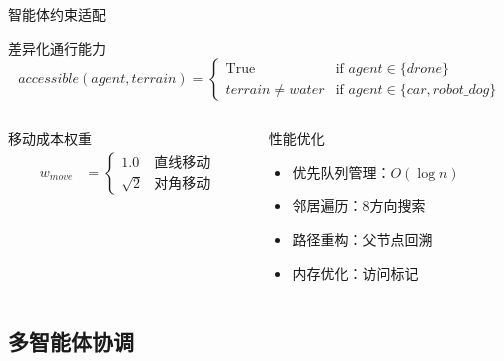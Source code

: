 \documentclass[
10pt,
aspectratio=169,
]{beamer}
\begin{document}
\begin{frame}{智能体约束适配}
    \begin{block}{差异化通行能力}
        \begin{equation}
            accessible(agent, terrain) = \begin{cases}
            \text{True} & \text{if } agent \in \{drone\} \\
            terrain \neq water & \text{if } agent \in \{car, robot\_dog\}
            \end{cases}
        \end{equation}
    \end{block}
    
    \begin{columns}
        \begin{column}{0.5\textwidth}
            \begin{exampleblock}{移动成本权重}
                \begin{align}
                    w_{move} &= \begin{cases}
                    1.0 & \text{直线移动} \\
                    \sqrt{2} & \text{对角移动}
                    \end{cases}
                \end{align}
            \end{exampleblock}
        \end{column}
        \begin{column}{0.5\textwidth}
            \begin{alertblock}{性能优化}
                \begin{itemize}
                    \item 优先队列管理：$O(\log n)$
                    \item 邻居遍历：8方向搜索
                    \item 路径重构：父节点回溯
                    \item 内存优化：访问标记
                \end{itemize}
            \end{alertblock}
        \end{column}
    \end{columns}
\end{frame}

\subsection{多智能体协调}
\end{document}
